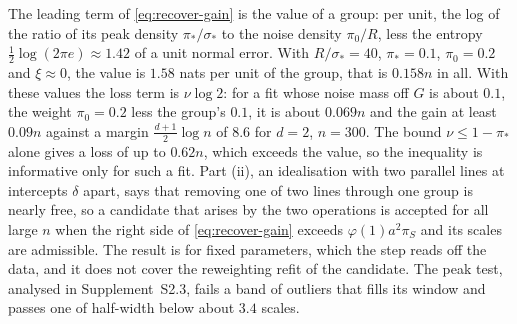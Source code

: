The leading term of \eqref{eq:recover-gain} is the value of a group: per unit, the log of
the ratio of its peak density $\pi_\ast/\sigma_\ast$ to the noise density $\pi_0/R$, less the
entropy $\tfrac12\log(2\pi e)\approx1.42$ of a unit normal error. With $R/\sigma_\ast=40$,
$\pi_\ast=0.1$, $\pi_0=0.2$ and $\xi\approx0$, the value is $1.58$ nats per unit of the group,
that is $0.158n$ in all. With these values the loss term is $\nu\log2$: for a fit whose noise
mass off $G$ is about $0.1$, the weight $\pi_0=0.2$ less the group's $0.1$, it is about $0.069n$
and the gain at least $0.09n$ against a margin $\tfrac{d+1}{2}\log n$ of $8.6$ for $d=2$,
$n=300$. The bound $\nu\le1-\pi_\ast$ alone gives a loss of up to $0.62n$, which exceeds the
value, so the inequality is informative only for such a fit. Part (ii), an idealisation with two parallel lines at intercepts $\delta$ apart, says that
removing one of two lines through one group is nearly free, so a candidate that arises by the two operations is accepted
for all large $n$ when the right side of \eqref{eq:recover-gain} exceeds $\varphi(1)a^{2}\pi_S$
and its scales are admissible. The result is for fixed parameters, which the step reads off
the data, and it does not cover the reweighting refit of the candidate. The peak test, analysed
in Supplement~S2.3, fails a band of outliers that fills its window and passes one of half-width
below about $3.4$ scales.
